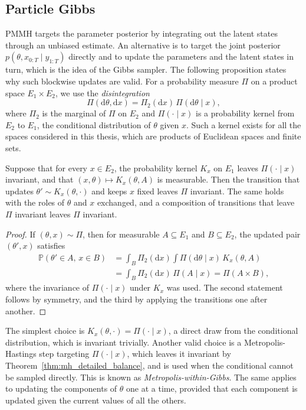 \subsection{Particle Gibbs}
\label{sec:particle_gibbs}
PMMH targets the parameter posterior by integrating out the latent states through an unbiased estimate. An alternative is to target the joint posterior $p(\theta,x_{0:T}\mid y_{1:T})$ directly and to update the parameters and the latent states in turn, which is the idea of the Gibbs sampler. The following proposition states why such blockwise updates are valid. For a probability measure $\Pi$ on a product space $E_1\times E_2$, we use the \emph{disintegration}
\begin{equation}
    \Pi(\mathrm{d}\theta,\mathrm{d}x) = \Pi_2(\mathrm{d}x)\,\Pi(\mathrm{d}\theta\mid x),
\end{equation}
where $\Pi_2$ is the marginal of $\Pi$ on $E_2$ and $\Pi(\cdot\mid x)$ is a probability kernel from $E_2$ to $E_1$, the conditional distribution of $\theta$ given $x$. Such a kernel exists for all the spaces considered in this thesis, which are products of Euclidean spaces and finite sets.

\begin{proposition}
    \label{prop:blockwise_invariance}
    Suppose that for every $x\in E_2$, the probability kernel $K_x$ on $E_1$ leaves $\Pi(\cdot\mid x)$ invariant, and that $(x,\theta)\mapsto K_x(\theta,A)$ is measurable. Then the transition that updates $\theta'\sim K_x(\theta,\cdot)$ and keeps $x$ fixed leaves $\Pi$ invariant. The same holds with the roles of $\theta$ and $x$ exchanged, and a composition of transitions that leave $\Pi$ invariant leaves $\Pi$ invariant.
\end{proposition}
\begin{proof}
    If $(\theta,x)\sim\Pi$, then for measurable $A\subseteq E_1$ and $B\subseteq E_2$, the updated pair $(\theta',x)$ satisfies
    \begin{align}
        \mathbb{P}(\theta'\in A,\,x\in B) &= \int_B\Pi_2(\mathrm{d}x)\int\Pi(\mathrm{d}\theta\mid x)\,K_x(\theta,A) \\
        &= \int_B\Pi_2(\mathrm{d}x)\,\Pi(A\mid x) = \Pi(A\times B),
    \end{align}
    where the invariance of $\Pi(\cdot\mid x)$ under $K_x$ was used. The second statement follows by symmetry, and the third by applying the transitions one after another.
\end{proof}

The simplest choice is $K_x(\theta,\cdot) = \Pi(\cdot\mid x)$, a direct draw from the conditional distribution, which is invariant trivially. Another valid choice is a Metropolis-Hastings step targeting $\Pi(\cdot\mid x)$, which leaves it invariant by Theorem~\ref{thm:mh_detailed_balance}, and is used when the conditional cannot be sampled directly. This is known as \emph{Metropolis-within-Gibbs}. The same applies to updating the components of $\theta$ one at a time, provided that each component is updated given the current values of all the others.

